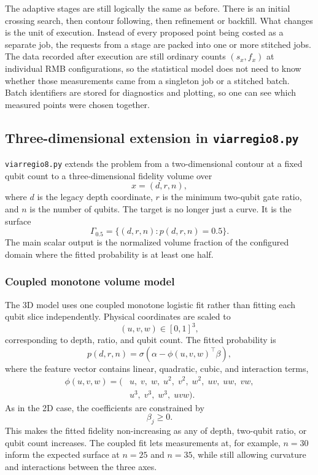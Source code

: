 The adaptive stages are still logically the same as before.  There is an
initial crossing search, then contour following, then refinement or backfill.
What changes is the unit of execution.  Instead of every proposed point being
costed as a separate job, the requests from a stage are packed into one or more
stitched jobs.  The data recorded after execution are still ordinary counts
\((s_x,f_x)\) at individual RMB configurations, so the statistical model does
not need to know whether those measurements came from a singleton job or a
stitched batch.  Batch identifiers are stored for diagnostics and plotting, so
one can see which measured points were chosen together.

\subsection{Three-dimensional extension in \texttt{viarregio8.py}}

\texttt{viarregio8.py} extends the problem from a two-dimensional contour at a
fixed qubit count to a three-dimensional fidelity volume over
\[
    x = (d,r,n),
\]
where \(d\) is the legacy depth coordinate, \(r\) is the minimum two-qubit gate
ratio, and \(n\) is the number of qubits.  The target is no longer just a curve.
It is the surface
\[
    \Gamma_{0.5}
    =
    \{(d,r,n): p(d,r,n)=0.5\}.
\]
The main scalar output is the normalized volume fraction of the configured
domain where the fitted probability is at least one half.

\subsubsection{Coupled monotone volume model}

The 3D model uses one coupled monotone logistic fit rather than fitting each
qubit slice independently.  Physical coordinates are scaled to
\[
    (u,v,w) \in [0,1]^3,
\]
corresponding to depth, ratio, and qubit count.  The fitted probability is
\[
    p(d,r,n)
    =
    \sigma\!\left(
        \alpha - \phi(u,v,w)^\top\beta
    \right),
\]
where the feature vector contains linear, quadratic, cubic, and interaction
terms,
\[
\begin{aligned}
    \phi(u,v,w) =
    (&u,\;v,\;w,\;u^2,\;v^2,\;w^2,\;uv,\;uw,\;vw,\\
     &u^3,\;v^3,\;w^3,\;uvw).
\end{aligned}
\]
As in the 2D case, the coefficients are constrained by
\[
    \beta_j \geq 0.
\]
This makes the fitted fidelity non-increasing as any of depth, two-qubit ratio,
or qubit count increases.  The coupled fit lets measurements at, for example,
\(n=30\) inform the expected surface at \(n=25\) and \(n=35\), while still
allowing curvature and interactions between the three axes.

